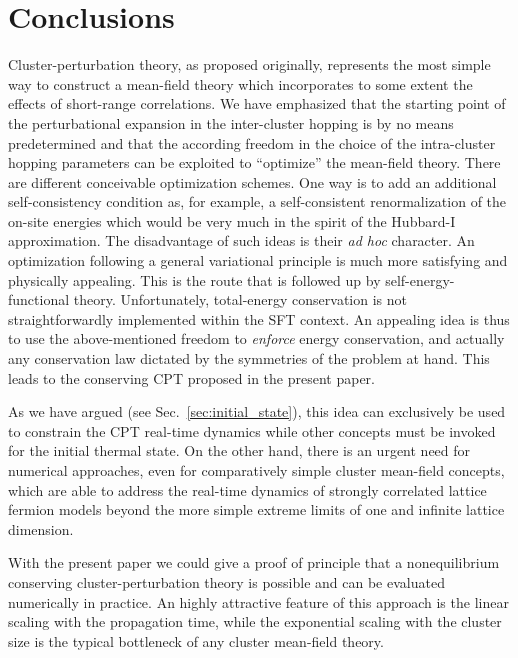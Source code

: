 \documentclass[twocolumn,prb,showpacs,aps,superscriptaddress]{revtex4}
\begin{document}
\section{Conclusions}
\label{sec:con}

Cluster-perturbation theory, as proposed originally, represents the most simple
way to construct a mean-field theory which incorporates to some extent the
effects of short-range correlations.  We have emphasized that the starting
point of the perturbational expansion in the inter-cluster hopping is by no
means predetermined and that the according freedom in the choice of the
intra-cluster hopping parameters can be exploited to ``optimize'' the
mean-field theory.  There are different conceivable optimization schemes.  One
way is to add an additional self-consistency condition as, for example, a
self-consistent renormalization of the on-site energies which would be very
much in the spirit of the Hubbard-I approximation.  The disadvantage of such
ideas is their {\em ad hoc} character.  An optimization following a general
variational principle is much more satisfying and physically appealing.  This
is the route that is followed up by self-energy-functional theory.
Unfortunately, total-energy conservation is not straightforwardly implemented
within the SFT context.  An appealing idea is thus to use the above-mentioned
freedom to {\em enforce} energy conservation, and actually any conservation law
dictated by the symmetries of the problem at hand.  This leads to the
conserving CPT proposed in the present paper. 

As we have argued (see Sec.\ \ref{sec:initial_state}), this idea can
exclusively be used to constrain the CPT real-time dynamics while other
concepts must be invoked for the initial thermal state.  On the other hand,
there is an urgent need for numerical approaches, even for comparatively simple
cluster mean-field concepts, which are able to address the real-time dynamics
of strongly correlated lattice fermion models beyond the more simple extreme
limits of one and infinite lattice dimension.  

With the present paper we could
give a proof of principle that a nonequilibrium conserving cluster-perturbation
theory is possible and can be evaluated numerically in practice.  An highly
attractive feature of this approach is the linear scaling with the propagation
time, while the exponential scaling with the cluster size is the typical
bottleneck of any cluster mean-field theory. 
\end{document}
